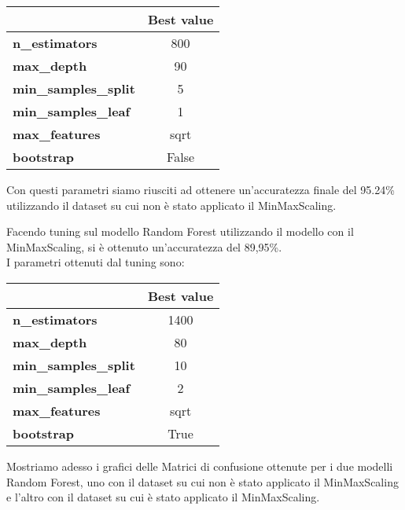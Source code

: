 \documentclass[../../Report.tex]{subfiles}
\begin{document}
\begin{table}[H]
    \centering
    \begin{tabular}{|l|c|}
        \hline
        & \textbf{Best value} \\
        \hline
        \textbf{n\_estimators} & 800 \\
        \hline
        \textbf{max\_depth} & 90 \\
        \hline
        \textbf{min\_samples\_split} & 5 \\
        \hline
        \textbf{min\_samples\_leaf} & 1 \\
        \hline
        \textbf{max\_features} & sqrt \\
        \hline
        \textbf{bootstrap} & False \\
        \hline
    \end{tabular}
\end{table}

Con questi parametri siamo riusciti ad ottenere un'accuratezza finale del 95.24\% utilizzando il dataset su cui non è stato applicato il MinMaxScaling.

Facendo tuning sul modello Random Forest utilizzando il modello con il MinMaxScaling, si è ottenuto un'accuratezza del 89,95\%.\\
I parametri ottenuti dal tuning sono:

\begin{table}[H]
    \centering
    \begin{tabular}{|l|c|}
        \hline
        & \textbf{Best value} \\
        \hline
        \textbf{n\_estimators} & 1400 \\
        \hline
        \textbf{max\_depth} & 80 \\
        \hline
        \textbf{min\_samples\_split} & 10 \\
        \hline
        \textbf{min\_samples\_leaf} & 2 \\
        \hline
        \textbf{max\_features} & sqrt \\
        \hline
        \textbf{bootstrap} & True \\
        \hline
    \end{tabular}
\end{table}

Mostriamo adesso i grafici delle Matrici di confusione ottenute per i due modelli Random Forest, uno con il dataset su cui non è stato applicato il MinMaxScaling e l'altro con il dataset su cui è stato applicato il MinMaxScaling.
\end{document}
